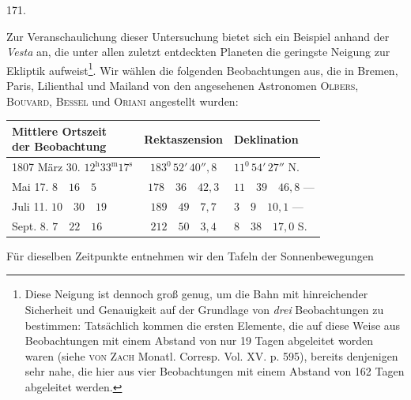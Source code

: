 \par{}\medskip
\begin{center}\hypertarget{native-236-article171}{}171.\end{center}
Zur Veranschaulichung dieser Untersuchung bietet sich ein Beispiel anhand der \emph{Vesta} an, die unter allen zuletzt entdeckten Planeten die geringste Neigung zur Ekliptik aufweist\footnote{Diese Neigung ist dennoch groß genug, um die Bahn mit hinreichender Sicherheit und Genauigkeit auf der Grundlage von \emph{drei} Beobachtungen zu bestimmen: Tatsächlich kommen die ersten Elemente, die auf diese Weise aus Beobachtungen mit einem Abstand von nur 19 Tagen abgeleitet worden waren (siehe \textsc{von Zach} Monatl. Corresp. Vol. XV. p. 595), bereits denjenigen sehr nahe, die hier aus vier Beobachtungen mit einem Abstand von 162 Tagen abgeleitet werden.}. Wir wählen die folgenden Beobachtungen aus, die in Bremen, Paris, Lilienthal und Mailand von den angesehenen Astronomen \textsc{Olbers}, \textsc{Bouvard}, \textsc{Bessel} und \textsc{Oriani} angestellt wurden:
\begin{center}
\begingroup\fontsize{9}{11}\selectfont\setlength{\tabcolsep}{3pt}
\begin{tabular}{|l|c|l|}
\hline
\shortstack{Mittlere Ortszeit\\der Beobachtung} & Rektaszension & Deklination\\\hline
1807 März 30. $12^{\mathrm h}33^{\mathrm m}17^{\mathrm s}$ & $183^0\,52'\,40''{,}8$ & $11^0\,54'\,27''$ N.\\
\phantom{1807 }Mai 17. $8\quad16\quad5$ & $178\quad36\quad42{,}3$ & $11\quad39\quad46{,}8$ —\\
\phantom{1807 }Juli 11. $10\quad30\quad19$ & $189\quad49\quad7{,}7$ & $3\quad9\quad10{,}1$ —\\
\phantom{1807 }Sept. 8. $7\quad22\quad16$ & $212\quad50\quad3{,}4$ & $8\quad38\quad17{,}0$ S.\\\hline
\end{tabular}\endgroup
\end{center}
Für dieselben Zeitpunkte entnehmen wir den Tafeln der Sonnenbewegungen
